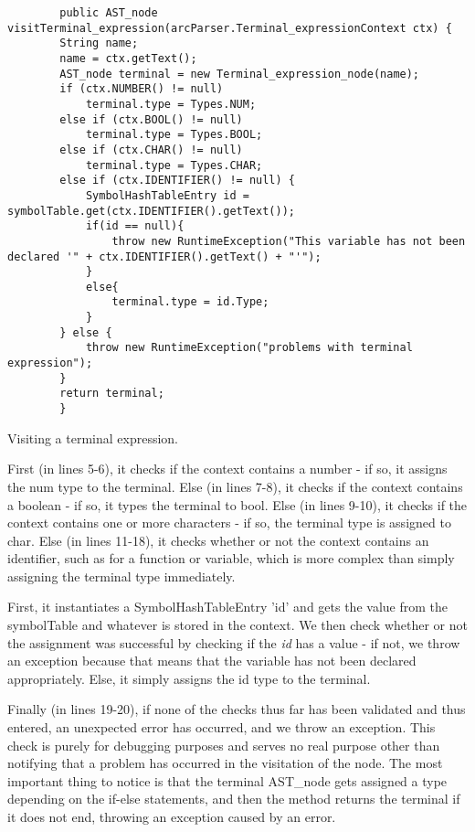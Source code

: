 \begin{listing}[htb!]
    \begin{verbatim}
        public AST_node visitTerminal_expression(arcParser.Terminal_expressionContext ctx) {
        String name;
        name = ctx.getText();
        AST_node terminal = new Terminal_expression_node(name);
        if (ctx.NUMBER() != null)
            terminal.type = Types.NUM;
        else if (ctx.BOOL() != null)
            terminal.type = Types.BOOL;
        else if (ctx.CHAR() != null)
            terminal.type = Types.CHAR;
        else if (ctx.IDENTIFIER() != null) {
            SymbolHashTableEntry id = symbolTable.get(ctx.IDENTIFIER().getText());
            if(id == null){
                throw new RuntimeException("This variable has not been declared '" + ctx.IDENTIFIER().getText() + "'");
            }
            else{
                terminal.type = id.Type;
            }
        } else {
            throw new RuntimeException("problems with terminal expression");
        }
        return terminal;
        }
    \end{verbatim}
    \caption{Visiting a terminal expression.}
    \label{lst:visitorterminalexpression}
\end{listing}


First (in lines 5-6), it checks if the context contains a number - if so, it assigns the num type to the terminal. Else (in lines 7-8), it checks if the context contains a boolean - if so, it types the terminal to bool. Else (in lines 9-10), it checks if the context contains one or more characters - if so, the terminal type is assigned to char. Else (in lines 11-18), it checks whether or not the context contains an identifier, such as for a function or variable, which is more complex than simply assigning the terminal type immediately.

First, it instantiates a SymbolHashTableEntry 'id' and gets the value from the symbolTable and whatever is stored in the context. We then check whether or not the assignment was successful by checking if the \textit{id} has a value - if not, we throw an exception because that means that the variable has not been declared appropriately. Else, it simply assigns the id type to the terminal.

Finally (in lines 19-20), if none of the checks thus far has been validated and thus entered, an unexpected error has occurred, and we throw an exception. This check is purely for debugging purposes and serves no real purpose other than notifying that a problem has occurred in the visitation of the node. The most important thing to notice is that the terminal AST\_node gets assigned a type depending on the if-else statements, and then the method returns the terminal if it does not end, throwing an exception caused by an error.


